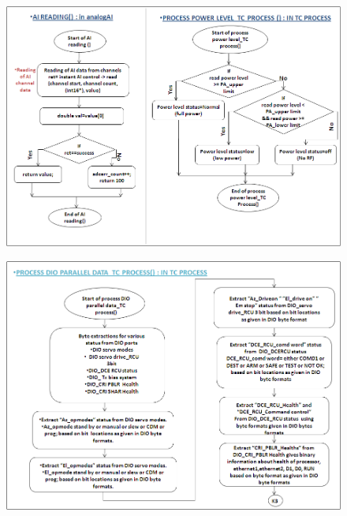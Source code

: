 \begin{figure}[H]
	\centering
	\includegraphics[width=\linewidth]{./FlowCharts/PngFlowCharts/TCP5.png}
\end{figure}

\begin{figure}[H]
	\centering
	\includegraphics[width=\linewidth]{./FlowCharts/PngFlowCharts/TCP6.png}
\end{figure}

